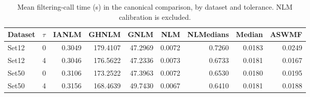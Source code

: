 \begin{table}[!t]
\centering
\caption{Mean filtering-call time (s) in the canonical comparison, by dataset and tolerance. NLM calibration is excluded.}
\label{tab:official_timing}
\small
\setlength{\tabcolsep}{4pt}
\begin{tabular}{llrrrrrrr}
\toprule
Dataset & $\tau$ & IANLM & GHNLM & GNLM & NLM & NLMedians & Median & ASWMF\\
\midrule
Set12 & 0 & 0.3049 & 179.4107 & 47.2969 & 0.0072 & 0.7260 & 0.0183 & 0.0249\\
Set12 & 4 & 0.3046 & 176.5622 & 47.2336 & 0.0073 & 0.6733 & 0.0181 & 0.0167\\
Set50 & 0 & 0.3106 & 173.2522 & 47.3963 & 0.0072 & 0.6530 & 0.0180 & 0.0195\\
Set50 & 4 & 0.3156 & 168.4639 & 49.7430 & 0.0067 & 0.6410 & 0.0181 & 0.0188\\
\bottomrule
\end{tabular}
\end{table}
